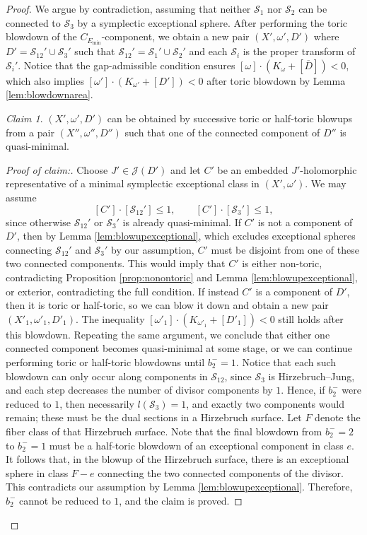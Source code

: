\documentclass[11pt]{article}
\theoremstyle{definition}
\theoremstyle{remark}
\newtheorem{claim}[theorem]{Claim}
\newcommand{\st}{\mathcal{S}}
\begin{document}
\begin{proof}
  We argue by contradiction, assuming that neither $\st_1$ nor $\st_2$ can be connected to $\st_3$ by a symplectic exceptional sphere. After performing the toric blowdown of the $C_{E_{\text{min}}}$-component, we obtain a new pair $(X',\omega',D')$ where $D'=\st_{12}'\cup\st_3'$ such that $\st_{12}'=\st_1'\cup\st_2'$ and each $\st_i$ is the proper transform of $\st_i'$. Notice that the gap-admissible condition ensures $[\omega]\cdot(K_\omega+[\overline{D}])<0$, which also implies  $[\omega']\cdot(K_{\omega'}+[D'])<0$ after toric blowdown by Lemma \ref{lem:blowdownarea}.

 \begin{claim}
$(X',\omega',D')$ can be obtained by successive toric or half-toric blowups from a pair $(X'',\omega'',D'')$ such that one of the connected component of $D''$ is quasi-minimal.
\end{claim}
 \begin{proof}[Proof of claim:] Choose $J'\in\mathcal{J}(D')$ and let $C'$ be an embedded $J'$-holomorphic representative of a minimal symplectic exceptional class in $(X',\omega')$. We may assume
 \[
 [C']\cdot [\st_{12}']\leq 1,\qquad [C']\cdot [\st_3']\leq 1,
 \]
 since otherwise $\st_{12}'$ or $\st_3'$ is already quasi-minimal. If $C'$ is not a component of $D'$, then by Lemma \ref{lem:blowupexceptional}, which excludes exceptional spheres connecting $\st_{12}'$ and $\st_3'$ by our assumption, $C'$ must be disjoint from one of these two connected components. This would imply that $C'$ is either non-toric, contradicting Proposition \ref{prop:nonontoric} and Lemma \ref{lem:blowupexceptional}, or exterior, contradicting the full condition. If instead $C'$ is a component of $D'$, then it is toric or half-toric, so we can blow it down and obtain a new pair $(X'_1,\omega'_1,D'_1)$. The inequality
 \(
 [\omega'_1]\cdot(K_{\omega'_1}+[D'_1])<0
 \)
 still holds after this blowdown. Repeating the same argument, we conclude that either one connected component becomes quasi-minimal at some stage, or we can continue performing toric or half-toric blowdowns until $b_2^-=1$. Notice that each such blowdown can only occur along components in $\st_{12}$, since $\st_3$ is Hirzebruch--Jung, and each step decreases the number of divisor components by $1$. Hence, if $b_2^-$ were reduced to $1$, then necessarily $l(\st_3)=1$, and exactly two components would remain; these must be the dual sections in a Hirzebruch surface. Let $F$ denote the fiber class of that Hirzebruch surface. Note that the final blowdown from $b_2^-=2$ to $b_2^-=1$ must be a half-toric blowdown of an exceptional component in class $e$. It follows that, in the blowup of the Hirzebruch surface, there is an exceptional sphere in class $F-e$ connecting the two connected components of the divisor. This contradicts our assumption by Lemma \ref{lem:blowupexceptional}. Therefore, $b_2^-$ cannot be reduced to $1$, and the claim is proved.

\end{proof}
\end{proof}
\end{document}
